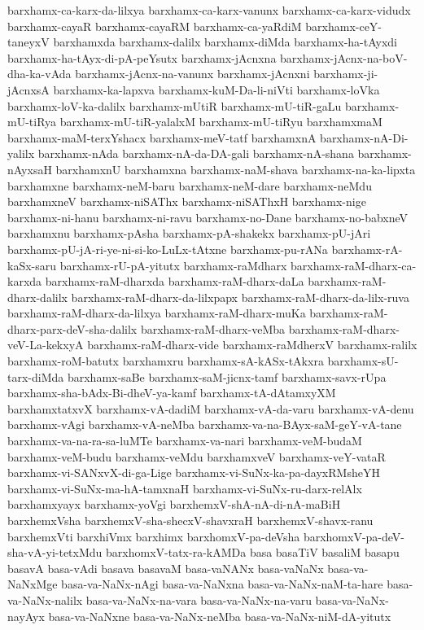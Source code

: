 {barxhamx-ca-karx-da-lilxya
barxhamx-ca-karx-vanunx
barxhamx-ca-karx-vidudx
barxhamx-cayaR
barxhamx-cayaRM
barxhamx-ca-yaRdiM
barxhamx-ceY-taneyxV
barxhamxda
barxhamx-dalilx
barxhamx-diMda
barxhamx-ha-tAyxdi
barxhamx-ha-tAyx-di-pA-peYsutx
barxhamx-jAcnxna
barxhamx-jAcnx-na-boV-dha-ka-vAda
barxhamx-jAcnx-na-vanunx
barxhamx-jAcnxni
barxhamx-ji-jAcnxsA
barxhamx-ka-lapxva
barxhamx-kuM-Da-li-niVti
barxhamx-loVka
barxhamx-loV-ka-dalilx
barxhamx-mUtiR
barxhamx-mU-tiR-gaLu
barxhamx-mU-tiRya
barxhamx-mU-tiR-yalalxM
barxhamx-mU-tiRyu
barxhamxmaM
barxhamx-maM-terxYshacx
barxhamx-meV-tatf
barxhamxnA
barxhamx-nA-Di-yalilx
barxhamx-nAda
barxhamx-nA-da-DA-gali
barxhamx-nA-shana
barxhamx-nAyxsaH
barxhamxnU
barxhamxna
barxhamx-naM-shava
barxhamx-na-ka-lipxta
barxhamxne
barxhamx-neM-baru
barxhamx-neM-dare
barxhamx-neMdu
barxhamxneV
barxhamx-niSAThx
barxhamx-niSAThxH
barxhamx-nige
barxhamx-ni-hanu
barxhamx-ni-ravu
barxhamx-no-Dane
barxhamx-no-babxneV
barxhamxnu
barxhamx-pAsha
barxhamx-pA-shakekx
barxhamx-pU-jAri
barxhamx-pU-jA-ri-ye-ni-si-ko-LuLx-tAtxne
barxhamx-pu-rANa
barxhamx-rA-kaSx-saru
barxhamx-rU-pA-yitutx
barxhamx-raMdharx
barxhamx-raM-dharx-ca-karxda
barxhamx-raM-dharxda
barxhamx-raM-dharx-daLa
barxhamx-raM-dharx-dalilx
barxhamx-raM-dharx-da-lilxpapx
barxhamx-raM-dharx-da-lilx-ruva
barxhamx-raM-dharx-da-lilxya
barxhamx-raM-dharx-muKa
barxhamx-raM-dharx-parx-deV-sha-dalilx
barxhamx-raM-dharx-veMba
barxhamx-raM-dharx-veV-La-kekxyA
barxhamx-raM-dharx-vide
barxhamx-raMdherxV
barxhamx-ralilx
barxhamx-roM-batutx
barxhamxru
barxhamx-sA-kASx-tAkxra
barxhamx-sU-tarx-diMda
barxhamx-saBe
barxhamx-saM-jicnx-tamf
barxhamx-savx-rUpa
barxhamx-sha-bAdx-Bi-dheV-ya-kamf
barxhamx-tA-dAtamxyXM
barxhamxtatxvX
barxhamx-vA-dadiM
barxhamx-vA-da-varu
barxhamx-vA-denu
barxhamx-vAgi
barxhamx-vA-neMba
barxhamx-va-na-BAyx-saM-geY-vA-tane
barxhamx-va-na-ra-sa-luMTe
barxhamx-va-nari
barxhamx-veM-budaM
barxhamx-veM-budu
barxhamx-veMdu
barxhamxveV
barxhamx-veY-vataR
barxhamx-vi-SANxvX-di-ga-Lige
barxhamx-vi-SuNx-ka-pa-dayxRMsheYH
barxhamx-vi-SuNx-ma-hA-tamxnaH
barxhamx-vi-SuNx-ru-darx-relAlx
barxhamxyayx
barxhamx-yoVgi
barxhemxV-shA-nA-di-nA-maBiH
barxhemxVsha
barxhemxV-sha-shecxV-shavxraH
barxhemxV-shavx-ranu
barxhemxVti
barxhiVmx
barxhimx
barxhomxV-pa-deVsha
barxhomxV-pa-deV-sha-vA-yi-tetxMdu
barxhomxV-tatx-ra-kAMDa
basa
basaTiV
basaliM
basapu
basavA
basa-vAdi
basava
basavaM
basa-vaNANx
basa-vaNaNx
basa-va-NaNxMge
basa-va-NaNx-nAgi
basa-va-NaNxna
basa-va-NaNx-naM-ta-hare
basa-va-NaNx-nalilx
basa-va-NaNx-na-vara
basa-va-NaNx-na-varu
basa-va-NaNx-nayAyx
basa-va-NaNxne
basa-va-NaNx-neMba
basa-va-NaNx-niM-dA-yitutx
}
